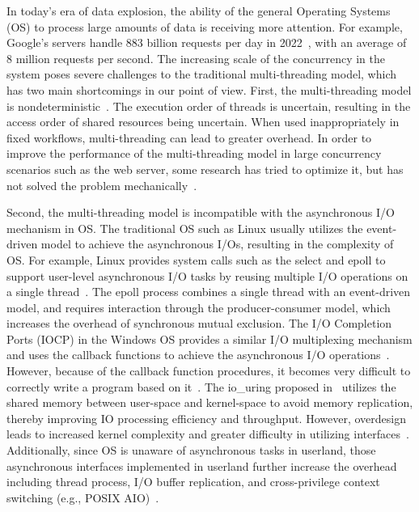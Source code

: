 \documentclass[sigconf,review,anonymous]{acmart}
\begin{document}
In today's era of data explosion, the ability of the general Operating Systems (OS) to process large amounts of data is receiving more attention. For example, Google's servers handle 883 billion requests per day in 2022~\cite{google-search-statistics}, with an average of 8 million requests per second. The increasing scale of the concurrency in the system poses severe challenges to the traditional multi-threading model, which has two main shortcomings in our point of view. First, the multi-threading model is nondeterministic~\cite{Lee:EECS-2006-1}. The execution order of threads is uncertain, resulting in the access order of shared resources being uncertain. When used inappropriately in fixed workflows, multi-threading can lead to greater overhead. In order to improve the performance of the multi-threading model in large concurrency scenarios such as the web server, some research has tried to optimize it, but has not solved the problem mechanically~\cite{li_combining_2007, howell_cooperative_2002}.

Second, the multi-threading model is incompatible with the asynchronous I/O mechanism in OS. The traditional OS such as Linux usually utilizes the event-driven model to achieve the asynchronous I/Os, resulting in the complexity of OS. For example, Linux provides system calls such as the select and epoll to support user-level asynchronous I/O tasks by reusing multiple I/O operations on a single thread~\cite{Gammo2004ComparingAE}. The epoll process combines a single thread with an event-driven model, and requires interaction through the producer-consumer model, which increases the overhead of synchronous mutual exclusion. The I/O Completion Ports (IOCP) in the Windows OS provides a similar I/O multiplexing mechanism and uses the callback functions to achieve the asynchronous I/O operations~\cite{alvinashcraft_io_2022}. However, because of the callback function procedures, it becomes very difficult to correctly write a program based on it~\cite{callbackhell}. The io\_uring proposed in~\cite{io_uring} utilizes the shared memory between user-space and kernel-space to avoid memory replication, thereby improving IO processing efficiency and throughput. However, overdesign leads to increased kernel complexity and greater difficulty in utilizing interfaces~\cite{li2021pm}. Additionally, since OS is unaware of asynchronous tasks in userland, those asynchronous interfaces implemented in userland further increase the overhead including thread process, I/O buffer replication, and cross-privilege context switching (e.g., POSIX AIO)~\cite{jones2006boost}.
\end{document}
